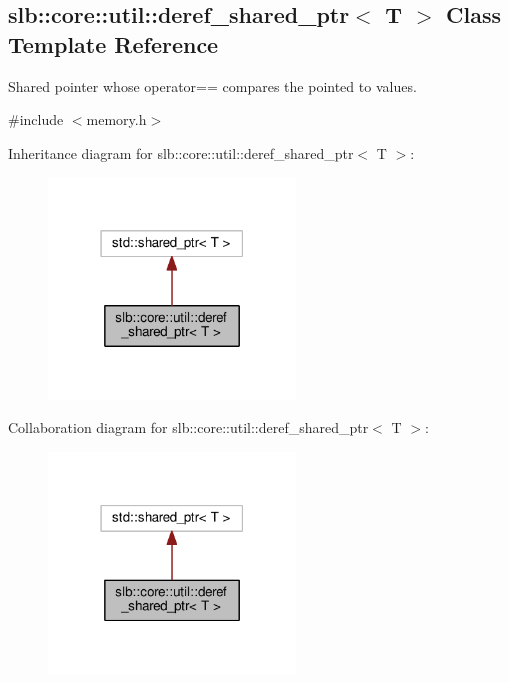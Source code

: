 \hypertarget{classslb_1_1core_1_1util_1_1deref__shared__ptr}{}\subsection{slb\+:\+:core\+:\+:util\+:\+:deref\+\_\+shared\+\_\+ptr$<$ T $>$ Class Template Reference}
\label{classslb_1_1core_1_1util_1_1deref__shared__ptr}


Shared pointer whose {\ttfamily operator==} compares the pointed to values.  




{\ttfamily \#include $<$memory.\+h$>$}



Inheritance diagram for slb\+:\+:core\+:\+:util\+:\+:deref\+\_\+shared\+\_\+ptr$<$ T $>$\+:\nopagebreak
\begin{figure}[H]
\begin{center}
\leavevmode
\includegraphics[width=186pt]{classslb_1_1core_1_1util_1_1deref__shared__ptr__inherit__graph}
\end{center}
\end{figure}


Collaboration diagram for slb\+:\+:core\+:\+:util\+:\+:deref\+\_\+shared\+\_\+ptr$<$ T $>$\+:\nopagebreak
\begin{figure}[H]
\begin{center}
\leavevmode
\includegraphics[width=186pt]{classslb_1_1core_1_1util_1_1deref__shared__ptr__coll__graph}
\end{center}
\end{figure}
